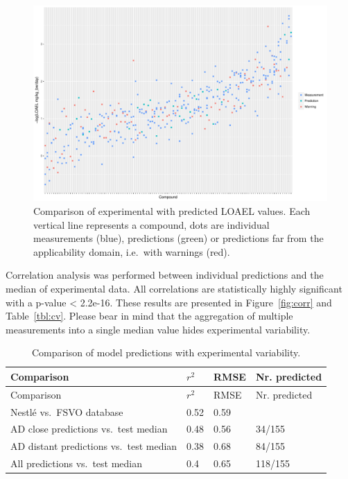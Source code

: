 \documentclass[]{achemso}
\begin{document}
\begin{figure}
\centering
\includegraphics{figures/test-prediction.pdf}
\caption{Comparison of experimental with predicted LOAEL values. Each
vertical line represents a compound, dots are individual measurements
(blue), predictions (green) or predictions far from the applicability
domain, i.e.~with warnings (red).}\label{fig:comp}
\end{figure}

Correlation analysis was performed between individual predictions and
the median of experimental data. All correlations are statistically
highly significant with a p-value \textless{} 2.2e-16. These results are
presented in Figure~\ref{fig:corr} and Table~\ref{tbl:cv}. Please bear
in mind that the aggregation of multiple measurements into a single
median value hides experimental variability.

\hypertarget{tbl:common-pred}{}
\begin{longtable}[]{@{}llll@{}}
\caption{\label{tbl:common-pred}Comparison of model predictions with
experimental variability. }\tabularnewline
\toprule
Comparison & \(r^2\) & RMSE & Nr. predicted\tabularnewline
\midrule
\endfirsthead
\toprule
Comparison & \(r^2\) & RMSE & Nr. predicted\tabularnewline
\midrule
\endhead
Nestlé vs.~FSVO database & 0.52 & 0.59\tabularnewline
AD close predictions vs.~test median & 0.48 & 0.56 &
34/155\tabularnewline
AD distant predictions vs.~test median & 0.38 & 0.68 &
84/155\tabularnewline
All predictions vs.~test median & 0.4 & 0.65 & 118/155\tabularnewline
\bottomrule
\end{longtable}
\end{document}

